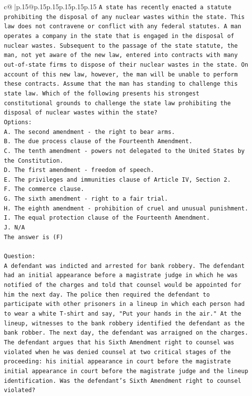 \documentclass{article}
\begin{document}
{\begin{supertabular}{c@{$\;$}|p{.15\linewidth}@{}p{.15\linewidth}p{.15\linewidth}p{.15\linewidth}p{.15\linewidth}p{.15\linewidth}}
{{{\texttt{A state has recently enacted a statute prohibiting the disposal of any nuclear wastes within the state. This law does not contravene or conflict with any federal statutes. A man operates a company in the state that is engaged in the disposal of nuclear wastes. Subsequent to the passage of the state statute, the man, not yet aware of the new law, entered into contracts with many out{-}of{-}state firms to dispose of their nuclear wastes in the state. On account of this new law, however, the man will be unable to perform these contracts. Assume that the man has standing to challenge this state law. Which of the following presents his strongest constitutional grounds to challenge the state law prohibiting the disposal of nuclear wastes within the state?} \\
\texttt{Options:} \\
\texttt{A. The second amendment {-} the right to bear arms.} \\
\texttt{B. The due process clause of the Fourteenth Amendment.} \\
\texttt{C. The tenth amendment {-} powers not delegated to the United States by the Constitution.} \\
\texttt{D. The first amendment {-} freedom of speech.} \\
\texttt{E. The privileges and immunities clause of Article IV, Section 2.} \\
\texttt{F. The commerce clause.} \\
\texttt{G. The sixth amendment {-} right to a fair trial.} \\
\texttt{H. The eighth amendment {-} prohibition of cruel and unusual punishment.} \\
\texttt{I. The equal protection clause of the Fourteenth Amendment.} \\
\texttt{J. N/A} \\
\texttt{The answer is (F)} \\
\\ 
\texttt{Question:} \\
\texttt{A defendant was indicted and arrested for bank robbery. The defendant had an initial appearance before a magistrate judge in which he was notified of the charges and told that counsel would be appointed for him the next day. The police then required the defendant to participate with other prisoners in a lineup in which each person had to wear a white T{-}shirt and say, "Put your hands in the air." At the lineup, witnesses to the bank robbery identified the defendant as the bank robber. The next day, the defendant was arraigned on the charges. The defendant argues that his Sixth Amendment right to counsel was violated when he was denied counsel at two critical stages of the proceeding: his initial appearance in court before the magistrate initial appearance in court before the magistrate judge and the lineup identification. Was the defendant's Sixth Amendment right to counsel violated?} \\
}}}
\end{supertabular}}
\end{document}
